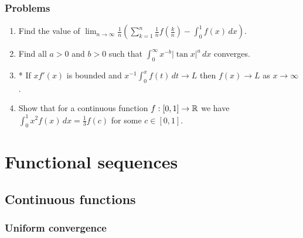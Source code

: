 \documentclass{../../large}
\begin{document}
\section*{Problems}
\begin{enumerate}
\item Find the value of $\lim_{n\to\infty}\frac1n\left(\sum_{k=1}^n\frac1nf\left(\frac kn\right)-\int_0^1f(x)\,dx\right)$.
\item Find all $a>0$ and $b>0$ such that $\int_0^\infty x^{-b}|\tan x|^a\,dx$ converges.
\item* If $xf'(x)$ is bounded and $x^{-1}\int_0^xf(t)\,dt\to L$ then $f(x)\to L$ as $x\to\infty$.
\item Show that for a continuous function $f:[0,1]\to\mathbb{R}$ we have $\int_0^1x^2f(x)\,dx=\frac13f(c)$ for some $c\in[0,1]$.
\end{enumerate}









\part{Functional sequences}

\chapter{Continuous functions}
\section{Uniform convergence}
\end{document}
